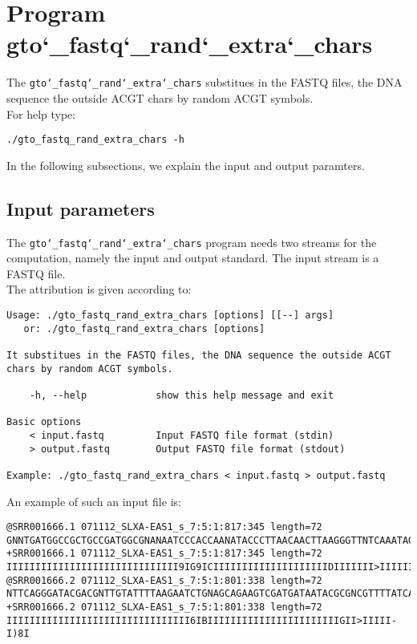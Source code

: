 \section{Program gto\char`_fastq\char`_rand\char`_extra\char`_chars}
The \texttt{gto\char`_fastq\char`_rand\char`_extra\char`_chars} substitues in the FASTQ files, the DNA sequence the outside ACGT chars by random ACGT symbols.\\
For help type:
\begin{lstlisting}
./gto_fastq_rand_extra_chars -h
\end{lstlisting}
In the following subsections, we explain the input and output paramters.

\subsection*{Input parameters}

The \texttt{gto\char`_fastq\char`_rand\char`_extra\char`_chars} program needs two streams for the computation, namely the input and output standard. The input stream is a FASTQ file.\\
The attribution is given according to:
\begin{lstlisting}
Usage: ./gto_fastq_rand_extra_chars [options] [[--] args]
   or: ./gto_fastq_rand_extra_chars [options]

It substitues in the FASTQ files, the DNA sequence the outside ACGT chars by random ACGT symbols.

    -h, --help            show this help message and exit

Basic options
    < input.fastq         Input FASTQ file format (stdin)
    > output.fastq        Output FASTQ file format (stdout)

Example: ./gto_fastq_rand_extra_chars < input.fastq > output.fastq
\end{lstlisting}
An example of such an input file is:
\begin{lstlisting}
@SRR001666.1 071112_SLXA-EAS1_s_7:5:1:817:345 length=72
GNNTGATGGCCGCTGCCGATGGCGNANAATCCCACCAANATACCCTTAACAACTTAAGGGTTNTCAAATAGA
+SRR001666.1 071112_SLXA-EAS1_s_7:5:1:817:345 length=72
IIIIIIIIIIIIIIIIIIIIIIIIIIIIII9IG9ICIIIIIIIIIIIIIIIIIIIIDIIIIIII>IIIIII/
@SRR001666.2 071112_SLXA-EAS1_s_7:5:1:801:338 length=72
NTTCAGGGATACGACGNTTGTATTTTAAGAATCTGNAGCAGAAGTCGATGATAATACGCGNCGTTTTATCAN
+SRR001666.2 071112_SLXA-EAS1_s_7:5:1:801:338 length=72
IIIIIIIIIIIIIIIIIIIIIIIIIIIIIIII6IBIIIIIIIIIIIIIIIIIIIIIIIGII>IIIII-I)8I
\end{lstlisting}

